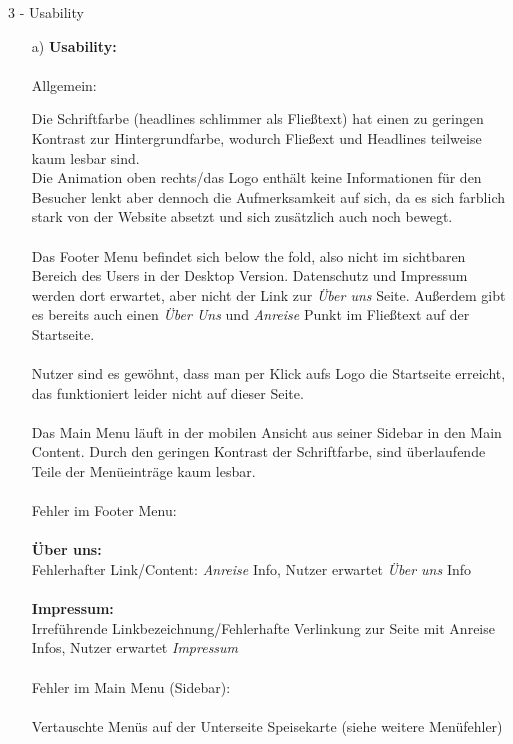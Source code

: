 \documentclass[a4paper]{article}
\begin{document}
\begin{exercise}{3 - Usability} 
\begin{itemize}
\item[a)]\textbf{Usability:}\\\\
{\Large Allgemein:}

Die Schriftfarbe (headlines schlimmer als Fließtext) hat einen zu geringen Kontrast zur Hintergrundfarbe, wodurch Fließext und Headlines teilweise kaum lesbar sind.\\
Die Animation oben rechts/das Logo enthält keine Informationen für den Besucher lenkt aber dennoch die Aufmerksamkeit auf sich, 
da es sich farblich stark von der Website absetzt und sich zusätzlich auch noch bewegt.\\\\
Das Footer Menu befindet sich below the fold, also nicht im sichtbaren Bereich des Users in der Desktop Version. Datenschutz und Impressum werden dort erwartet, aber nicht der Link zur \textit{Über uns} Seite.
Außerdem gibt es bereits auch einen \textit{Über Uns} und \textit{Anreise} Punkt im Fließtext auf der Startseite. \\\\
Nutzer sind es gewöhnt, dass man per Klick aufs Logo die Startseite erreicht, das funktioniert leider nicht auf dieser Seite.\\\\
Das Main Menu läuft in der mobilen Ansicht aus seiner Sidebar in den Main Content. Durch den geringen Kontrast der Schriftfarbe, sind überlaufende Teile der Menüeinträge kaum lesbar.\\\\
{\Large Fehler im Footer Menu:}\\\\
\textbf{Über uns:}\\
Fehlerhafter Link/Content: \textit{Anreise} Info, Nutzer erwartet \textit{Über uns} Info\\\\
\textbf{Impressum:}\\
Irreführende Linkbezeichnung/Fehlerhafte Verlinkung zur Seite mit Anreise Infos, Nutzer erwartet \textit{Impressum}\\\\
{\Large Fehler im Main Menu (Sidebar):}\\\\
Vertauschte Menüs auf der Unterseite Speisekarte (siehe weitere Menüfehler)\\\\

\end{itemize}
\end{exercise}
\end{document}
